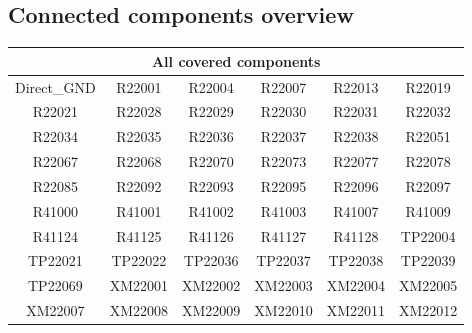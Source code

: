 \subsection{Connected components overview}
 \begin{center} 
  \begin{longtable}{|c|c|c|c|c|c|} 
   \hline 
    \multicolumn{6}{|c|}{All covered components}\\ 
   \hline 
    Direct\_GND & R22001 & R22004 & R22007 & R22013 & R22019 \\ \hline 
    R22021 & R22028 & R22029 & R22030 & R22031 & R22032 \\ \hline 
    R22034 & R22035 & R22036 & R22037 & R22038 & R22051 \\ \hline 
    R22067 & R22068 & R22070 & R22073 & R22077 & R22078 \\ \hline 
    R22085 & R22092 & R22093 & R22095 & R22096 & R22097 \\ \hline 
    R41000 & R41001 & R41002 & R41003 & R41007 & R41009 \\ \hline 
    R41124 & R41125 & R41126 & R41127 & R41128 & TP22004 \\ \hline 
    TP22021 & TP22022 & TP22036 & TP22037 & TP22038 & TP22039 \\ \hline 
    TP22069 & XM22001 & XM22002 & XM22003 & XM22004 & XM22005 \\ \hline 
    XM22007 & XM22008 & XM22009 & XM22010 & XM22011 & XM22012 \\ \hline 
  \end{longtable} 
 \end{center}
